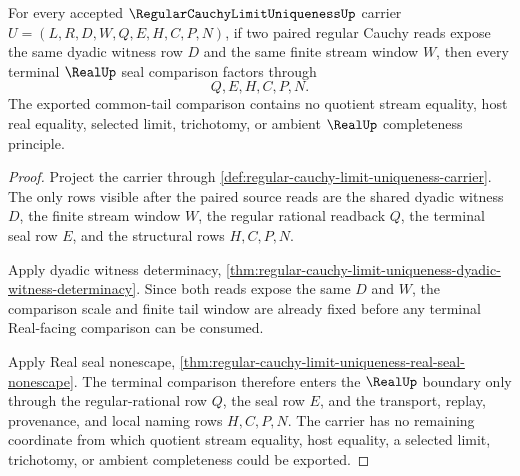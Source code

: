 \begin{theorem}
\label{thm:regular-cauchy-limit-uniqueness-common-tail-seal}
For every accepted $\RegularCauchyLimitUniquenessUp$ carrier $U=(L,R,D,W,Q,E,H,C,P,N)$, if two paired regular Cauchy reads expose the same dyadic witness row $D$ and the same finite stream window $W$, then every terminal $\RealUp$ seal comparison factors through
$$
Q,E,H,C,P,N .
$$
The exported common-tail comparison contains no quotient stream equality, host real equality, selected limit, trichotomy, or ambient $\RealUp$ completeness principle.
\end{theorem}
\begin{proof}
Project the carrier through \autoref{def:regular-cauchy-limit-uniqueness-carrier}. The only rows visible after the paired source reads are the shared dyadic witness $D$, the finite stream window $W$, the regular rational readback $Q$, the terminal seal row $E$, and the structural rows $H,C,P,N$.

Apply dyadic witness determinacy, \autoref{thm:regular-cauchy-limit-uniqueness-dyadic-witness-determinacy}. Since both reads expose the same $D$ and $W$, the comparison scale and finite tail window are already fixed before any terminal Real-facing comparison can be consumed.

Apply Real seal nonescape, \autoref{thm:regular-cauchy-limit-uniqueness-real-seal-nonescape}. The terminal comparison therefore enters the $\RealUp$ boundary only through the regular-rational row $Q$, the seal row $E$, and the transport, replay, provenance, and local naming rows $H,C,P,N$. The carrier has no remaining coordinate from which quotient stream equality, host equality, a selected limit, trichotomy, or ambient completeness could be exported.
\end{proof}

